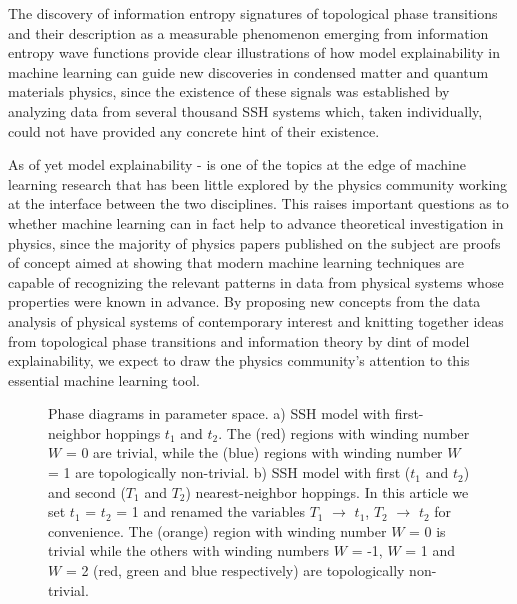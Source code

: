 \documentclass[10pt]{revtex4-1}
\newcommand{\citequote}[1]{\ref{#1}}
\newcommand\SSHOnePhaseDiagram{./ssh1_phase_diagram.png}
\newcommand\SSHTwoPhaseDiagram{./ssh2_phase_diagram.png}
\begin{document}
The  discovery of information entropy signatures of topological phase transitions and their description as a measurable phenomenon emerging from information entropy wave functions provide clear illustrations of how model explainability in machine learning can guide new discoveries in condensed matter and quantum materials physics, since the existence of these signals was established by analyzing data from several thousand SSH systems which, taken individually, could not have provided any concrete hint of their existence.%

As of yet model explainability \cite{gilpin2018explaining}-\cite{roscher2020explainable} is one of the topics at the edge of machine learning research that has been little explored by the physics community working at the interface between the two disciplines. This raises important questions as to whether machine learning can in fact help to advance theoretical investigation in physics, since the majority of physics papers published on the subject are proofs of concept aimed at showing that modern machine learning techniques are capable of recognizing the relevant patterns in data from physical systems whose properties were known in advance. By proposing new concepts from the data analysis of physical systems of contemporary interest and knitting together ideas from topological phase transitions and information theory by dint of model explainability, we expect to draw the physics community's attention to this essential machine learning tool. 
\begin{figure}
\centering
{}\quad
{}
\caption{Phase diagrams in parameter space. a) SSH model with first-neighbor hoppings $t_1$ and $t_2$. The (red) regions with winding number $W$ = 0 are trivial, while the (blue) regions with winding number $W$ = 1 are topologically non-trivial. b) SSH model with first ($t_1$ and $t_2$) and second ($T_1$ and $T_2$) nearest-neighbor hoppings. In this article we set $t_1$ = $t_2$ = 1 and renamed the variables $T_1$ $\rightarrow$ $t_1$, $T_2$ $\rightarrow$ $t_2$ for convenience. The (orange) region with winding number $W$ = 0 is trivial while the others with winding numbers $W$ = -1, $W$ = 1 and $W$ = 2 (red, green and blue respectively) are topologically non-trivial.}
\label{fig:phasediagrams}
\end{figure}
\end{document}
